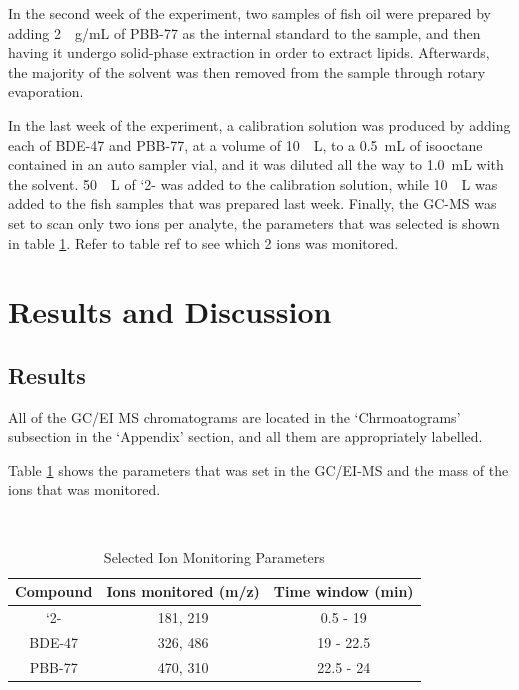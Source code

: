 \documentclass[a4paper, 12pt]{article}
\begin{document}
In the second week of the experiment, two samples of fish oil were prepared by adding \SI{2}{\mu{}g/mL} of PBB-77 as the internal standard to the sample, and then having it undergo solid-phase extraction in order to extract lipids. Afterwards, the majority of the solvent was then removed from the sample through rotary evaporation.

In the last week of the experiment, a calibration solution was produced by adding each of BDE-47 and PBB-77, at a volume of \SI{10}{\mu{}L}, to a \SI{0.5}{mL} of isooctane contained in an auto sampler vial, and it was diluted all the way to \SI{1.0}{mL} with the solvent. \SI{50}{\mu{}L} of `2- was added to the calibration solution, while \SI{10}{\mu{}L} was added to the fish samples that was prepared last week. Finally, the GC-MS was set to scan only two ions per analyte, the parameters that was selected is shown in table \ref{tab-para}. Refer to table ref to see which 2 ions was monitored.


\section{Results and Discussion}

\subsection{Results}
All of the GC/EI MS chromatograms are located in the `Chrmoatograms' subsection in the `Appendix' section, and all them are appropriately labelled.

Table \ref{tab-para} shows the parameters that was set in the GC/EI-MS and the mass of the ions that was monitored.

\begin{table}[h!]
	\centering
	\caption{Selected Ion Monitoring Parameters}
	\hfill \\
	\begin{tabular}{|c|c|c|}
		\hline
		Compound & Ions monitored (m/z) & Time window (min) \\
		\hline
		`2-\ce{HCH} & 181, 219 & 0.5 - 19 \\
		\hline
		BDE-47 & 326, 486 & 19 - 22.5 \\
		\hline
		PBB-77 & 470, 310 & 22.5 - 24 \\
		\hline
	\end{tabular}
	\label{tab-para}
\end{table}
\end{document}
